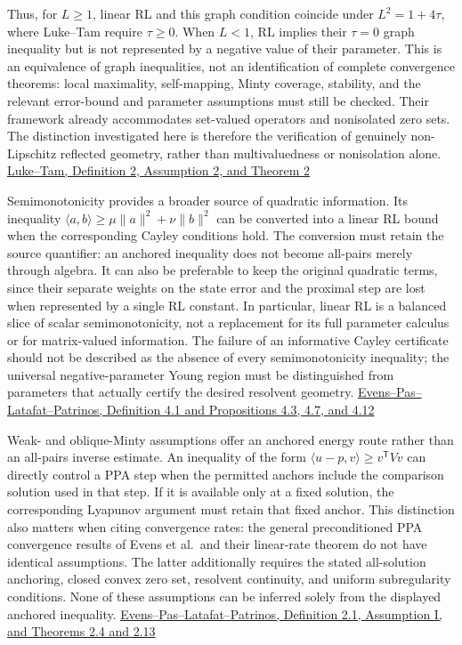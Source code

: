\documentclass[11pt,a4paper]{article}
\theoremstyle{plain}
\theoremstyle{definition}
\theoremstyle{remark}
\begin{document}
Thus, for \(L\ge1\), linear RL and this graph condition coincide under
\(L^2=1+4\tau\), where Luke--Tam require \(\tau\ge0\). When \(L<1\), RL
implies their \(\tau=0\) graph inequality but is not represented by a
negative value of their parameter. This is an equivalence of graph
inequalities, not an identification of complete convergence theorems:
local maximality, self-mapping, Minty coverage, stability, and the
relevant error-bound and parameter assumptions must still be checked.
Their framework already accommodates set-valued operators and
nonisolated zero sets. The distinction investigated here is therefore
the verification of genuinely non-Lipschitz reflected geometry, rather
than multivaluedness or nonisolation alone.
\href{https://pubsonline.informs.org/doi/10.1287/moor.2025.0863}{Luke--Tam,
Definition 2, Assumption 2, and Theorem 2}

Semimonotonicity provides a broader source of quadratic information. Its
inequality \(\langle a,b\rangle\ge\mu\|a\|^2+\nu\|b\|^2\) can be
converted into a linear RL bound when the corresponding Cayley
conditions hold. The conversion must retain the source quantifier: an
anchored inequality does not become all-pairs merely through algebra. It
can also be preferable to keep the original quadratic terms, since their
separate weights on the state error and the proximal step are lost when
represented by a single RL constant. In particular, linear RL is a
balanced slice of scalar semimonotonicity, not a replacement for its
full parameter calculus or for matrix-valued information. The failure of
an informative Cayley certificate should not be described as the absence
of every semimonotonicity inequality; the universal negative-parameter
Young region must be distinguished from parameters that actually certify
the desired resolvent geometry.
\href{https://arxiv.org/html/2305.03605v2\#S4}{Evens--Pas--Latafat--Patrinos,
Definition 4.1 and Propositions 4.3, 4.7, and 4.12}

Weak- and oblique-Minty assumptions offer an anchored energy route
rather than an all-pairs inverse estimate. An inequality of the form
\(\langle u-p,v\rangle\ge v^{\mathsf T}Vv\) can directly control a PPA
step when the permitted anchors include the comparison solution used in
that step. If it is available only at a fixed solution, the
corresponding Lyapunov argument must retain that fixed anchor. This
distinction also matters when citing convergence rates: the general
preconditioned PPA convergence results of Evens et al.~and their
linear-rate theorem do not have identical assumptions. The latter
additionally requires the stated all-solution anchoring, closed convex
zero set, resolvent continuity, and uniform subregularity conditions.
None of these assumptions can be inferred solely from the displayed
anchored inequality.
\href{https://arxiv.org/html/2305.03605v2\#S2}{Evens--Pas--Latafat--Patrinos,
Definition 2.1, Assumption I, and Theorems 2.4 and 2.13}
\end{document}

